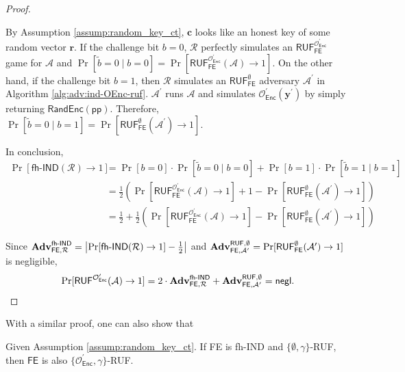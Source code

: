 \begin{proof}
\begin{figure}[h]
\end{figure}

By Assumption \ref{assump:random_key_ct}, $\mathbf{c}$ looks like an honest key of some random vector $\mathbf{r}$. If the challenge bit $b = 0$, $\mathcal{R}$ perfectly simulates an $\textsf{RUF}^{\mathcal{O}^\prime_{\textsf{Enc}}}_{\textsf{FE}}$ game for $\mathcal{A}$ and $\Pr[\tilde{b} = 0 \mid b = 0] = \Pr[ \textsf{RUF}^{\mathcal{O}^\prime_{\textsf{Enc}}}_{\textsf{FE}}(\mathcal{A}) \to 1 ]$. On the other hand, if the challenge bit $b = 1$, then $\mathcal{R}$ simulates an $\textsf{RUF}^{\emptyset}_{\textsf{FE}}$ adversary $\mathcal{A}^\prime$ in Algorithm \ref{alg:adv:ind-OEnc-ruf}. $\mathcal{A}^\prime$ runs $\mathcal{A}$ and simulates $\mathcal{O}^\prime_{\textsf{Enc}}(\mathbf{y}^\prime)$ by simply returning $\textsf{RandEnc}(\textsf{pp})$. Therefore, $\Pr[\tilde{b} = 0 \mid b = 1] = \Pr[ \textsf{RUF}^{\emptyset}_{\textsf{FE}}(\mathcal{A}^\prime) \to 1 ]$.

In conclusion,
\begin{align*}
	\Pr[\textsf{fh-IND}(\mathcal{R}) \to 1] 
	&= \Pr[b = 0] \cdot \Pr[\tilde{b} = 0 \mid b = 0] + \Pr[b = 1] \cdot \Pr[\tilde{b} = 1 \mid b = 1] \\
	&= \frac{1}{2} \left( \Pr[\textsf{RUF}^{\mathcal{O}^\prime_{\textsf{Enc}}}_{\textsf{FE}}(\mathcal{A}) \to 1] + 1 - \Pr[ \textsf{RUF}^{\emptyset}_{\textsf{FE}}(\mathcal{A}^\prime) \to 1 ] \right) \\
	&= \frac{1}{2} + \frac{1}{2} \left( \Pr[\textsf{RUF}^{\mathcal{O}^\prime_{\textsf{Enc}}}_{\textsf{FE}}(\mathcal{A}) \to 1] - \Pr[ \textsf{RUF}^{\emptyset}_{\textsf{FE}}(\mathcal{A}^\prime) \to 1 ] \right)
\end{align*}

Since $\mathbf{Adv}_{\textsf{FE}, \mathcal{R}}^\textsf{fh-IND} = \left| \Pr[\textsf{fh-IND}(\mathcal{R}) \to 1] - \frac{1}{2} \right|$ and $\mathbf{Adv}_{\textsf{FE}, \mathcal{A}^\prime }^{\textsf{RUF}, \emptyset} = \Pr[\textsf{RUF}^{\emptyset}_{\textsf{FE}}(\mathcal{A}^\prime) \to 1 ]$ is negligible,
\[
	\Pr[ \textsf{RUF}^{\mathcal{O}^\prime_{\textsf{Enc}}}(\mathcal{A}) \to 1]  = 2 \cdot \mathbf{Adv}_{\textsf{FE}, \mathcal{R}}^\textsf{fh-IND} + \mathbf{Adv}_{\textsf{FE}, \mathcal{A}^\prime }^{\textsf{RUF}, \emptyset} = \mathsf{negl}.
\]

\end{proof}

With a similar proof, one can also show that

\begin{theorem}
\label{thm:fh-IPFE:ind-OEnc-gamma-ruf}
Given Assumption \ref{assump:random_key_ct}. If \textsf{FE} is fh-IND and $\{ \emptyset, \gamma \}$-RUF, then $\textsf{FE}$ is also $\{ \mathcal{O}^\prime_{\textsf{Enc}}, \gamma \}$-RUF.

\end{theorem}

